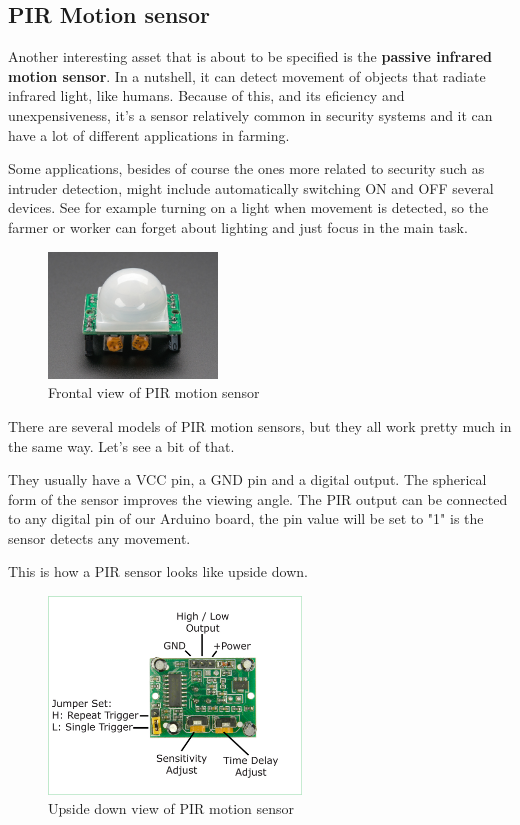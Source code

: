 \vspace{7mm}
\subsection{PIR Motion sensor}
Another interesting asset that is about to be specified is the \textbf{passive infrared motion sensor}\cite{pir-guide}. In a nutshell, it can detect movement of objects that radiate infrared light, like humans. Because of this, and its eficiency and unexpensiveness, it's a sensor relatively common in security systems and it can have a lot of different applications in farming.

\vspace{5mm}
Some applications, besides of course the ones more related to security such as intruder detection, might include automatically switching ON and OFF several devices. See for example turning on a light when movement is detected, so the farmer or worker can forget about lighting and just focus in the main task.

\vspace{5mm}
\begin{figure}[H]
    \centering
    \includegraphics[width=0.4\textwidth]{fig/pir.jpg}
    \caption{Frontal view of PIR motion sensor}
    \label{fig:pir}
\end{figure}


There are several models of PIR motion sensors, but they all work pretty much in the same way. Let's see a bit of that.

\vspace{5mm}
They usually have a VCC pin, a GND pin and a digital output. The spherical form of the sensor improves the viewing angle. The PIR output can be connected to any digital pin of our Arduino board, the pin value will be set to "1" is the sensor detects any movement.

This is how a PIR sensor looks like upside down.

\begin{figure}[H]
    \centering
    \includegraphics[width=0.6\textwidth]{fig/pir-upside-down.png}
    \caption{Upside down view of PIR motion sensor}
    \label{fig:pir-upsidedown}
\end{figure}


